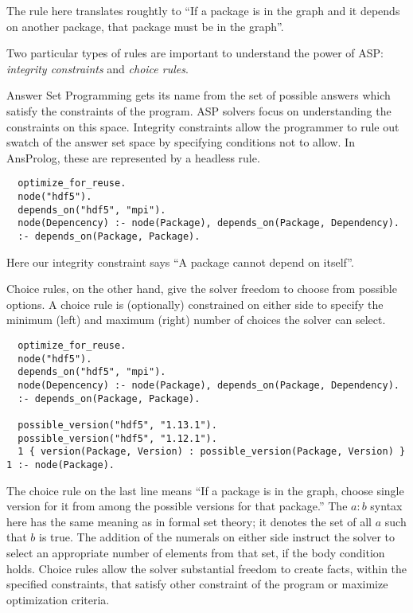 The rule here translates roughtly to ``If a package is in the graph and it depends on another package, that package must be in the graph''.

Two particular types of rules are important to understand the power of ASP: \textit{integrity constraints} and \textit{choice rules}.

Answer Set Programming gets its name from the set of possible answers which satisfy the constraints of the program.
ASP solvers focus on understanding the constraints on this space.
Integrity constraints allow the programmer to rule out swatch of the answer set space by specifying conditions not to allow.
In AnsProlog, these are represented by a headless rule.

\begin{verbatim}
  optimize_for_reuse.
  node("hdf5").
  depends_on("hdf5", "mpi").
  node(Depencency) :- node(Package), depends_on(Package, Dependency).
  :- depends_on(Package, Package).
\end{verbatim}

Here our integrity constraint says ``A package cannot depend on itself''.

Choice rules, on the other hand, give the solver freedom to choose from possible options.
A choice rule is (optionally) constrained on either side to specify the minimum (left) and maximum (right) number of choices the solver can select.

\begin{verbatim}
  optimize_for_reuse.
  node("hdf5").
  depends_on("hdf5", "mpi").
  node(Depencency) :- node(Package), depends_on(Package, Dependency).
  :- depends_on(Package, Package).

  possible_version("hdf5", "1.13.1").
  possible_version("hdf5", "1.12.1").
  1 { version(Package, Version) : possible_version(Package, Version) } 1 :- node(Package).
\end{verbatim}

The choice rule on the last line means ``If a package is in the graph, choose single version for it from among the possible versions for that package.''
The ${a:b}$ syntax here has the same meaning as in formal set theory; it denotes the set of all $a$ such that $b$ is true.
The addition of the numerals on either side instruct the solver to select an appropriate number of elements from that set, if the body condition holds.
Choice rules allow the solver substantial freedom to create facts, within the specified constraints, that satisfy other constraint of the program or maximize optimization criteria.

